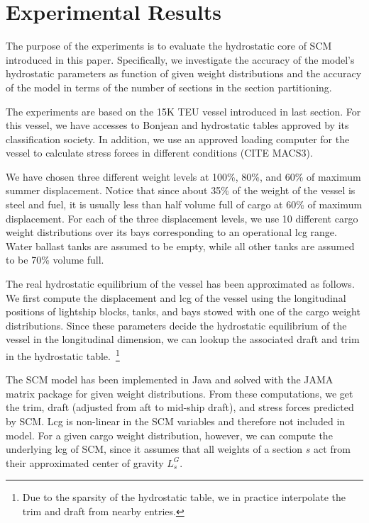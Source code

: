 \documentclass[runningheads]{llncs}
\begin{document}
 
\section{Experimental Results}
 
The purpose of the experiments is to evaluate the hydrostatic core of SCM introduced in this paper. Specifically, we investigate the accuracy of the model's hydrostatic parameters as function of given weight distributions and the accuracy of the model in terms of the number of sections in the section partitioning.

The experiments are based on the 15K TEU vessel introduced in last section. For this vessel, we have accesses to Bonjean and hydrostatic tables approved by its classification society. In addition, we use an approved loading computer for the vessel to calculate stress forces in different conditions (CITE MACS3).

We have chosen three different weight levels at 100\%, 80\%, and 60\% of maximum summer displacement. Notice that since about 35\% of the weight of the vessel is steel and fuel, it is usually less than half volume full of cargo at 60\% of maximum displacement. For each of the three displacement levels, we use 10 different cargo weight distributions over its bays corresponding to an operational lcg range. Water ballast tanks are assumed to be empty, while all other tanks are assumed to be 70\% volume full.

The real hydrostatic equilibrium of the vessel has been approximated as follows. We first compute the displacement and lcg of the vessel using the longitudinal positions of lightship blocks, tanks, and bays stowed with one of the cargo weight distributions. Since these parameters decide the hydrostatic equilibrium of the vessel in the longitudinal dimension, we can lookup the associated draft and trim in the hydrostatic table.~\footnote{Due to the sparsity of the hydrostatic table, we in practice interpolate the trim and draft from nearby entries.}    

The SCM model has been implemented in Java and solved with the JAMA matrix package for given weight distributions. From these computations, we get the trim, draft (adjusted from aft to mid-ship draft), and stress forces predicted by SCM. Lcg is non-linear in the SCM variables and therefore not included in model. For a given cargo weight distribution, however, we can compute the underlying lcg of SCM, since it assumes that all weights of a section $s$ act from their approximated center of gravity $L^G_s$. 
\end{document}
